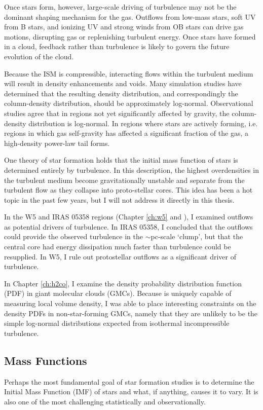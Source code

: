 Once stars form, however, large-scale driving of turbulence may not be the
dominant shaping mechanism for the gas.  Outflows from low-mass stars, soft UV
from B stars, and ionizing UV and strong winds from OB stars can drive gas
motions, disrupting gas or replenishing turbulent energy.  Once stars have
formed in a cloud, feedback rather than turbulence is likely to govern the
future evolution of the cloud.

Because the ISM is compressible, interacting flows within the turbulent medium
will result in density enhancements and voids.  Many simulation studies have
determined that the resulting density distribution, and correspondingly the
column-density distribution, should be approximately log-normal.  Observational
studies agree that in regions not yet significantly affected by gravity, the 
column-density distribution is log-normal.  In regions where stars are actively
forming, i.e. regions in which gas self-gravity has affected a significant fraction
of the gas, a high-density power-law tail forms.

One theory of star formation holds that the initial mass function of stars is
determined entirely by turbulence.  In this description, the highest
overdensities in the turbulent medium become gravitationally unstable and
separate from the turbulent flow as they collapse into proto-stellar cores.
This idea has been a hot topic in the past few years, but I will not address
it directly in this thesis.

In the W5 and IRAS 05358 regions (Chapter \ref{ch:w5} and
\citet{Ginsburg2009}), I examined outflows as potential drivers of turbulence.
In IRAS 05358, I concluded that the outflows could provide the observed
turbulence in the $\sim$pc-scale `clump', but that the central core had energy
dissipation much faster than turbulence could be resupplied.  In W5, I rule out
protostellar outflows as a significant driver of turbulence.

In Chapter \ref{ch:h2co}, I examine the density probability distribution
function (PDF) in giant molecular clouds (GMCs).  Because \formaldehyde is
uniquely capable of measuring local volume density, I was able to place
interesting constraints on the density PDFs in non-star-forming GMCs, namely
that they are unlikely to be the simple log-normal distributions expected from
isothermal incompressible turbulence.


\subsection{Mass Functions}
\label{sec:massfunctions}
Perhaps the most fundamental goal of star formation studies is to determine the
Initial Mass Function (IMF) of stars and what, if anything, causes it to vary.
It is also one of the most challenging statistically and observationally.

